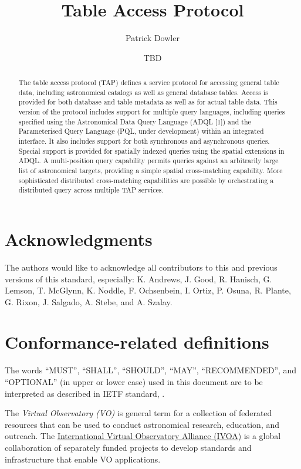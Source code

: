 \documentclass[11pt,a4paper]{ivoa}
\title{Table Access Protocol}
\author{Patrick Dowler}
\author{TBD}
\begin{document}
\begin{abstract}
The table access protocol (TAP) defines a service protocol for accessing general 
table data, including astronomical catalogs as well as general database tables. 
Access is provided for both database and table metadata as well as for actual 
table data. This version of the protocol includes support for multiple query 
languages, including queries specified using the Astronomical Data Query 
Language (ADQL [1]) and the Parameterised Query Language (PQL, under 
development) within an integrated interface. It also includes support for both 
synchronous and asynchronous queries. Special support is provided for spatially 
indexed queries using the spatial extensions in ADQL. A multi-position query 
capability permits queries against an arbitrarily large list of astronomical 
targets, providing a simple spatial cross-matching capability. More 
sophisticated distributed cross-matching capabilities are possible by 
orchestrating a distributed query across multiple TAP services.  
\end{abstract}


\section*{Acknowledgments}

The authors would like to acknowledge all contributors to this and previous 
versions of this standard, especially: K. Andrews, J. Good, R. Hanisch, G. 
Lemson, T. McGlynn, K. Noddle, F. Ochsenbein, I. Ortiz, P. Osuna, R. Plante, G. 
Rixon, J. Salgado, A. Stebe, and A. Szalay.


\section*{Conformance-related definitions}

The words ``MUST'', ``SHALL'', ``SHOULD'', ``MAY'', ``RECOMMENDED'', and
``OPTIONAL'' (in upper or lower case) used in this document are to be
interpreted as described in IETF standard, \citet{std:RFC2119}.

The \emph{Virtual Observatory (VO)} is general term for a collection of 
federated resources that can be used to conduct astronomical research, 
education, and outreach. The \href{http://www.ivoa.net}{International
Virtual Observatory Alliance (IVOA)} is a global collaboration of separately 
funded projects to develop standards and infrastructure that enable VO 
applications.
\end{document}

